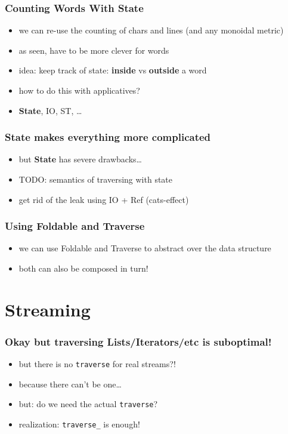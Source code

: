 \documentclass[aspectratio=169]{beamer}
\begin{document}
\begin{frame}
  \frametitle{Counting Words \textemdash{} With State}
  \begin{itemize}
  \item we can re-use the counting of chars and lines (and any monoidal metric)
  \item as seen, have to be more clever for words
  \item idea: keep track of state: \textbf{inside} vs \textbf{outside} a word
  \item how to do this with applicatives?
  \item \textbf{State}, IO, ST, \ldots{}
  \end{itemize}
\end{frame}

\begin{frame}
  \frametitle{State makes everything more complicated}
  \begin{itemize}
  \item but \textbf{State} has severe drawbacks\dots
  \item TODO: semantics of traversing with state
  \item get rid of the leak using IO + Ref (cats-effect)
  \end{itemize}
\end{frame}

\begin{frame}
  \frametitle{Using Foldable and Traverse}
  \begin{itemize}
  \item we can use Foldable and Traverse to abstract over the data structure
  \item both can also be composed in turn!
  \end{itemize}
\end{frame}

\section{Streaming}\label{sec:streaming}

\begin{frame}
  \frametitle{Okay but traversing Lists/Iterators/etc is suboptimal!}
  \begin{itemize}
  \item but there is no \texttt{traverse} for real streams?!
  \item because there can't be one\ldots
  \item but: do we need the actual \texttt{traverse}?
  \item realization: \texttt{traverse\_} is enough!
  \end{itemize}
\end{frame}
\end{document}
